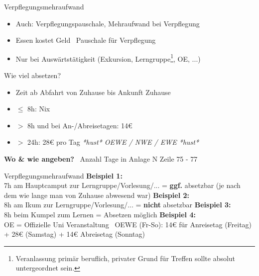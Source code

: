 \documentclass{beamer}
\begin{document}
			\begin{frame}[label={verpflegungsmehraufwand}]{Verpflegungsmehraufwand}
				\begin{itemize}
					\item Auch: Verpflegungspauschale, Mehraufwand bei Verpflegung
					\item Essen kostet Geld \textrightarrow\ Pauschale für Verpflegung
					\item Nur bei Auswärtstätigkeit (Exkursion, Lerngruppe\footnote{Veranlassung primär beruflich, privater Grund für Treffen sollte absolut untergeordnet sein.}, OE, ...)
				\end{itemize}\n\pause
				Wie viel absetzen?
				\begin{itemize}
					\item Zeit ab Abfahrt von Zuhause bis Ankunft Zuhause
					\item $\leq$ 8h: Nix
					\item $>$ 8h und bei An-/Abreisetagen: 14€
					\item $>$ 24h: 28€ pro Tag {\tiny \textit{*hust* OEWE / NWE / EWE *hust*}}
				\end{itemize}\n\pause
				\textbf{Wo \& wie angeben?} \textrightarrow\ Anzahl Tage in Anlage N Zeile 75 - 77 
			\end{frame}
		
			\begin{frame}{Verpflegungsmehraufwand}
				\textbf{Beispiel 1:}\\
				7h am Hauptcamput zur Lerngruppe/Vorlesung/... = \textbf{ggf.} absetzbar (je nach dem wie lange man von Zuhause abwesend war)\n\pause
				\textbf{Beispiel 2:}\\
				8h am Ikum zur Lerngruppe/Vorlesung/... = \textbf{nicht} absetzbar\n\pause
				\textbf{Beispiel 3:}\\
				8h beim Kumpel zum Lernen = Absetzen möglich\n\pause
				\textbf{Beispiel 4:}\\
				OE = Offizielle Uni Veranstaltung \textrightarrow\ OEWE (Fr-So): 14€ für Anreisetag (Freitag) + 28€ (Samstag) + 14€ Abreisetag (Sonntag)
			\end{frame}
		
\end{document}
